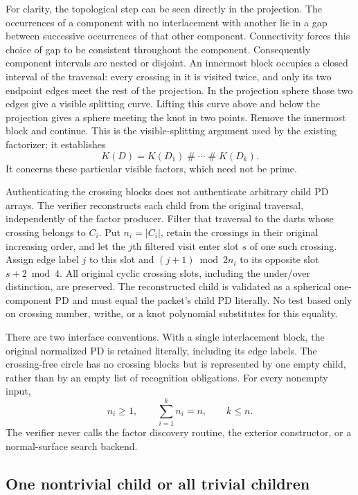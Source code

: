For clarity, the topological step can be seen directly in the projection.
The occurrences of a component with no interlacement with another lie in
a gap between successive occurrences of that other component.  Connectivity
forces this choice of gap to be consistent throughout the component.
Consequently component intervals are nested or disjoint.  An innermost
block occupies a closed interval of the traversal: every crossing in it
is visited twice, and only its two endpoint edges meet the rest of the
projection.  In the projection sphere those two edges give a visible
splitting curve.  Lifting this curve above and below the projection gives
a sphere meeting the knot in two points.  Remove the innermost block and
continue.  This is the visible-splitting argument used by the existing
factorizer; it establishes
\[
 K(D)=K(D_1)\mathbin{\#}\cdots\mathbin{\#}K(D_k).
\]
It concerns these particular visible factors, which need not be prime.

Authenticating the crossing blocks does not authenticate arbitrary child
PD arrays.  The verifier reconstructs each child from the original
traversal, independently of the factor producer.  Filter that traversal
to the darts whose crossing belongs to $C_i$.  Put $n_i=|C_i|$, retain
the crossings in their original increasing order, and let the $j$th
filtered visit enter slot $s$ of one such crossing.  Assign edge label
$j$ to this slot and $(j+1)\bmod 2n_i$ to its opposite slot
$s+2\bmod4$.  All original cyclic crossing slots, including the
under/over distinction, are preserved.  The reconstructed child is
validated as a spherical one-component PD and must equal the packet's
child PD literally.  No test based only on crossing number, writhe, or
a knot polynomial substitutes for this equality.

There are two interface conventions.  With a single interlacement block,
the original normalized PD is retained literally, including its edge
labels.  The crossing-free circle has no crossing blocks but is represented
by one empty child, rather than by an empty list of recognition obligations.
For every nonempty input,
\[
 n_i\ge1,\qquad \sum_{i=1}^k n_i=n,\qquad k\le n.
\]
The verifier never calls the factor discovery routine, the exterior
constructor, or a normal-surface search backend.

\subsection{One nontrivial child or all trivial children}

